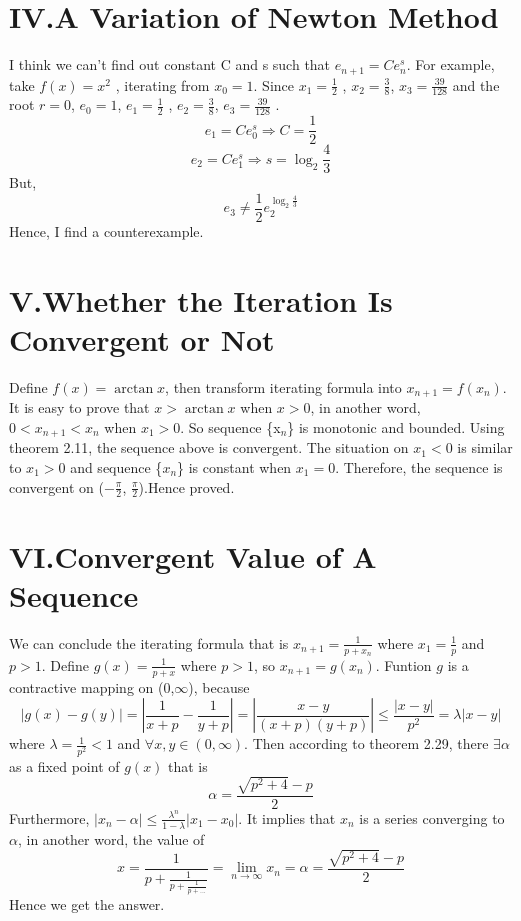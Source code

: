 \documentclass[twoside,a4paper,12pt]{article}
\begin{document}
\section*{IV.A Variation of Newton Method}
I think we can't find out constant C and s such that $e_{n+1}=Ce_n^s$. For example, take $f(x)=x^2$ , iterating from $x_0=1$. Since $x_1 = \frac{1}{2}$ , $x_2=\frac{3}{8}$, $x_3=\frac{39}{128}$ and the root $r=0$, $e_0=1$, $e_1 = \frac{1}{2}$ , $e_2=\frac{3}{8}$, $e_3=\frac{39}{128}$ . 
\[
e_1=Ce_0^s \Longrightarrow C=\frac{1}{2}
\]
\[
e_2=Ce_1^s \Longrightarrow s=\log_2\frac{4}{3}
\]
But, 
\[
e_3 \neq \frac{1}{2}e_2^{\log_2{\frac{4}{3}}}
\]
Hence, I find a counterexample.

\section*{V.Whether the Iteration Is Convergent or Not}
Define $f(x) = \arctan{x}$, then transform iterating formula into $x_{n+1} = f(x_n)$. It is easy to prove that $x>\arctan{x}$ when $x>0$, in another word, $0<x_{n+1} < x_n $ when $x_1>0$. So sequence \{x$_n$\} is monotonic and bounded. Using theorem 2.11, the sequence above is convergent. The situation on $x_1<0$ is similar to $x_1>0$ and sequence \{$x_n$\} is constant when $x_1=0$. Therefore, the sequence is convergent on ($-\frac{\pi}{2}$, $\frac{\pi}{2}$).Hence proved.

\section*{VI.Convergent Value of A Sequence}
We can conclude the iterating formula that is $x_{n+1} = \frac{1}{p+x_n}$ where $x_1 = \frac{1}{p}$ and $p > 1$. Define $g(x) = \frac{1}{p+x}$ where $p > 1$, so $x_{n+1}= g(x_n)$. Funtion $g$ is a contractive mapping on (0,$\infty$), because 
\[
|g(x)-g(y)|=|\frac{1}{x+p}-\frac{1}{y+p}| = |\frac{x-y}{(x+p)(y+p)}| \le \frac{|x-y|}{p^2} = \lambda |x-y| 
\]
where $\lambda = \frac{1}{p^2} < 1$ and $\forall x,y \in (0,\infty)$. Then according to theorem 2.29, there $\exists \alpha$ as a fixed point of $g(x)$ that is
\[ 
\alpha=\frac{\sqrt{p^2+4}-p}{2}
\]
Furthermore, $|x_n-\alpha| \le \frac{\lambda^n}{1-\lambda}|x_1-x_0|$. It implies that ${x_n}$ is a series converging to $\alpha$, in another word, the value of
\begin{equation}
 x= \frac{1}{p+\frac{1}{p+\frac{1}{p+...}}}=\lim_{n\to\infty} x_n=\alpha=\frac{\sqrt{p^2+4}-p}{2}
\end{equation}
Hence we get the answer.
\end{document}
